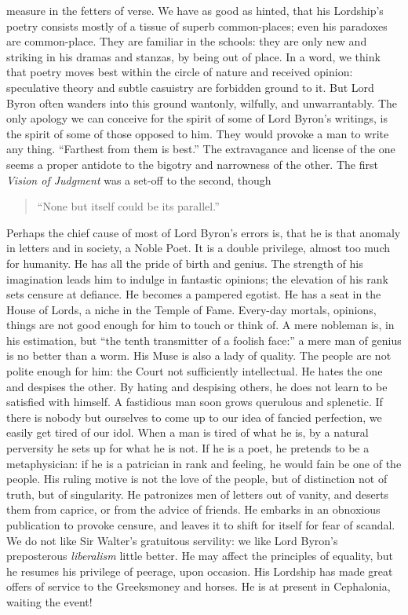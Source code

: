 measure in the fetters of verse. We have as good as hinted, that his
Lordship's poetry consists mostly of a tissue of superb common-places;
even his paradoxes are common-place. They are familiar in the schools:
they are only new and striking in his dramas and stanzas, by being out
of place. In a word, we think that poetry moves best within the circle
of nature and received opinion: speculative theory and subtle casuistry
are forbidden ground to it. But Lord Byron often wanders into this
ground wantonly, wilfully, and unwarrantably. The only apology we can
conceive for the spirit of some of Lord Byron's writings, is the spirit
of some of those opposed to him. They would provoke a man to write any
thing. ``Farthest from them is best.'' The extravagance and license of the
one seems a proper antidote to the bigotry and narrowness of the other.
The first \emph{Vision of Judgment} was a set-off to the second, though
\begin{quote}
  ``None but itself could be its parallel.''

\end{quote}
Perhaps the chief cause of most of Lord Byron's errors is, that he is
that anomaly in letters and in society, a Noble Poet. It is a double
privilege, almost too much for humanity. He has all the pride of birth
and genius. The strength of his imagination leads him to indulge in
fantastic opinions; the elevation of his rank sets censure at defiance.
He becomes a pampered egotist. He has a seat in the House of Lords, a
niche in the Temple of Fame. Every-day mortals, opinions, things are not
good enough for him to touch or think of. A mere nobleman is, in his
estimation, but ``the tenth transmitter of a foolish face:'' a mere man of
genius is no better than a worm. His Muse is also a lady of quality.
The people are not polite enough for him: the Court not sufficiently
intellectual. He hates the one and despises the other. By hating and
despising others, he does not learn to be satisfied with himself. A
fastidious man soon grows querulous and splenetic. If there is nobody
but ourselves to come up to our idea of fancied perfection, we easily
get tired of our idol. When a man is tired of what he is, by a natural
perversity he sets up for what he is not. If he is a poet, he pretends
to be a metaphysician: if he is a patrician in rank and feeling, he
would fain be one of the people. His ruling motive is not the love of
the people, but of distinction not of truth, but of singularity. He
patronizes men of letters out of vanity, and deserts them from caprice,
or from the advice of friends. He embarks in an obnoxious publication to
provoke censure, and leaves it to shift for itself for fear of scandal.
We do not like Sir Walter's gratuitous servility: we like Lord Byron's
preposterous \emph{liberalism} little better. He may affect the principles of
equality, but he resumes his privilege of peerage, upon occasion. His
Lordship has made great offers of service to the Greeks\textemdash money and
horses. He is at present in Cephalonia, waiting the event!

